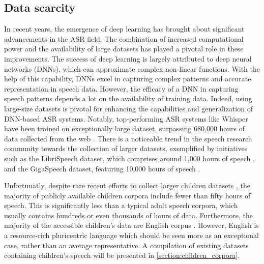 \subsection{Data scarcity}%
\label{section:data_scarcity}
In recent years, the emergence of deep learning has brought about significant advancements in the ASR field. The combination of increased computational power and the availability of large datasets has played a pivotal role in these improvements. The success of deep learning is largely attributed to deep neural networks (DNNs), which can approximate complex non-linear functions. With the help of this capability, DNNs excel in capturing complex patterns and accurate representation in speech data. However, the efficacy of a DNN in capturing speech patterns depends a lot on the availability of training data. Indeed, using large-size datasets is pivotal for enhancing the capabilities and generalization of DNN-based ASR systems. Notably, top-performing ASR systems like Whisper have been trained on  exceptionally large dataset, surpassing 680,000 hours of data collected from the web \cite{radford2023robust}. There is a noticeable trend in the speech research community towards the collection of larger datasets, exemplified by initiatives such as the LibriSpeech dataset, which comprises around 1,000 hours of speech \cite{librispeech}, and the GigaSpeech dataset, featuring 10,000 hours of speech \cite{chen2021gigaspeech}.

Unfortunatly, despite rare recent efforts to collect larger children datasets \cite{MyST,singakids,ahmed2021auskidtalk}, the majority of publicly available children corpora include fewer than fifty hours of speech. This is significantly less than a typical adult speech corpora, which usually contains hundreds or even thousands of hours of data. Furthermore, the majority of the accessible children's data are English corpus \cite{MyST,cmu,cslu,pf-star-british,ahmed2021auskidtalk}. However, English is a resource-rich pluricentric language which should be seen more as an exceptional case, rather than an average representative. A compilation of existing datasets containing children's speech will be presented in \ref{section:children_corpora}.

